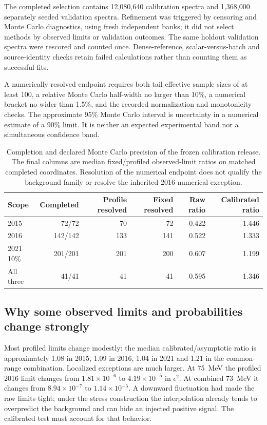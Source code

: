The completed selection contains 12,080,640 calibration spectra and
1,368,000 separately seeded validation spectra. Refinement was triggered
by censoring and Monte Carlo diagnostics, using fresh independent banks;
it did not select methods by observed limits or validation outcomes.
The same holdout validation spectra were rescored and counted once.
Dense-reference, scalar-versus-batch and source-identity checks retain
failed calculations rather than counting them as successful fits.

A numerically resolved endpoint requires both tail effective sample
sizes of at least 100, a relative Monte Carlo half-width no larger than 10\%,
a numerical bracket no wider than 1.5\%, and the recorded normalization
and monotonicity checks. The approximate 95\% Monte Carlo interval is
uncertainty in a numerical estimate of a 90\% limit. It is neither an
expected experimental band nor a simultaneous confidence band.

\begin{table}[htbp]\centering\small
\begin{tabular}{lrrrrr}\toprule
Scope & Completed & Profile resolved & Fixed resolved & Raw ratio & Calibrated ratio\\\midrule
2015 & 72/72 & 70 & 72 & 0.422 & 1.446\\
2016 & 142/142 & 133 & 141 & 0.522 & 1.333\\
2021 10\% & 201/201 & 201 & 200 & 0.607 & 1.199\\
All three & 41/41 & 41 & 41 & 0.595 & 1.346\\\bottomrule
\end{tabular}
\caption{Completion and declared Monte Carlo precision of the frozen
calibration release. The final columns are median fixed/profiled
observed-limit ratios on matched completed coordinates. Resolution of
the numerical endpoint does not qualify the background family or resolve
the inherited 2016 numerical exception.}
\label{v5-tab:calibration-summary}
\end{table}

\subsection{Why some observed limits and probabilities change strongly}
Most profiled limits change modestly: the median calibrated/asymptotic
ratio is approximately 1.08 in 2015, 1.09 in 2016, 1.04 in 2021 and 1.21
in the common-range combination. Localized exceptions are much larger.
At 75~MeV the profiled 2016 limit changes from $1.81\times10^{-6}$ to
$4.19\times10^{-5}$ in $\epsilon^2$. At combined 73~MeV it changes from
$8.94\times10^{-7}$ to $1.14\times10^{-5}$. A downward fluctuation had
made the raw limits tight; under the stress construction the interpolation
already tends to overpredict the background and can hide an injected
positive signal. The calibrated test must account for that behavior.

